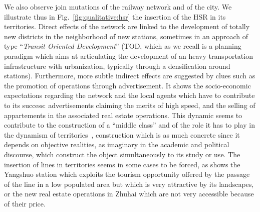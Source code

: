 \documentclass[11pt]{article}
\begin{document}
We also observe join mutations of the railway network and of the city. We illustrate thus in Fig.~\ref{fig:qualitative:hsr} the insertion of the HSR in its territories. Direct effects of the network are linked to the development of totally new districts in the neighborhood of new stations, sometimes in an approach of type ``\emph{Transit Oriented Development}'' (TOD, which as we recall is a planning paradigm which aims at articulating the development of an heavy transportation infrastructure with urbanization, typically through a densification around stations). Furthermore, more subtle indirect effects are suggested by clues such as the promotion of operations through advertisement. It shows the socio-economic expectations regarding the network and the local agents which have to contribute to its success: advertisements claiming the merits of high speed, and the selling of appartements in the associated real estate operations. This dynamic seems to contribute to the construction of a ``middle class'' and of the role it has to play in the dynamism of territories~\citep{rocca2008power}, construction which is as much concrete since it depends on objective realities, as imaginary in the academic and political discourse, which construct the object simultaneously to its study or use. The insertion of lines in territories seems in some cases to be forced, as shows the Yangshuo station which exploits the tourism opportunity offered by the passage of the line in a low populated area but which is very attractive by its landscapes, or the new real estate operations in Zhuhai which are not very accessible because of their price.
\end{document}
